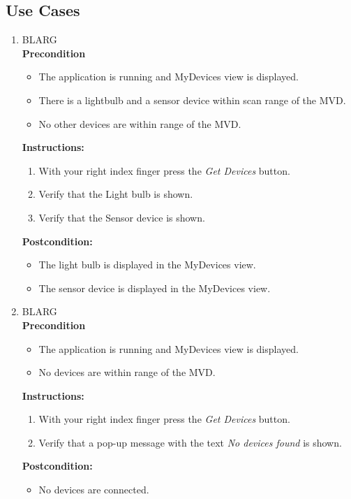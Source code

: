 \documentclass[a4paper]{article}
\newlength{\testlabellength}
\newenvironment{testlist}{\begin{enumerate}[label=\bfseries Instruction \thesubsection.\arabic* , labelindent=0pt, labelwidth=\testlabellength , leftmargin=2cm]}{\end{enumerate}}
\newenvironment{precondition}{
{\color{white}BLARG}\\ 
\textbf{Precondition}
\begin{itemize}[labelindent=0cm, labelwidth=2cm , leftmargin=1cm]
}
{\end{itemize}}
\newenvironment{instruction}{
\textbf{Instructions:}
\begin{enumerate}[label=\bfseries  \arabic*., labelindent=0cm, labelwidth=2cm , leftmargin=1cm]
}
{\end{enumerate}}
\newenvironment{postcondition}{
\textbf{Postcondition:}
\begin{itemize}[labelindent=0cm, labelwidth=2cm , leftmargin=1cm]
}
{\end{itemize}}
\begin{document}
\begin{appendices}
\subsection{Use Cases}
\begin{testlist}
	\item 
		\begin{precondition}
			\item The application is running and MyDevices view is displayed.
			\item There is a lightbulb and a sensor device within scan range of the MVD.
			\item No other devices are within range of the MVD.
		\end{precondition}
		\begin{instruction}
			\item With your right index finger press the \emph{Get Devices} button.
			\item Verify that the Light bulb is shown.
			\item Verify that the Sensor device is shown.
		\end{instruction}
		\begin{postcondition}
			\item The light bulb is displayed in the MyDevices view.
		 	\item The sensor device is displayed in the MyDevices view.
		\end{postcondition}

	\item 
	\begin{precondition}
		\item The application is running and MyDevices view is displayed.
		\item No devices are within range of the MVD.
	\end{precondition}
	\begin{instruction}
			\item With your right index finger press the \emph{Get Devices} button.
			\item Verify that a pop-up message with the text \emph{No devices found} is shown.
	\end{instruction}
	\begin{postcondition}
		\item No devices are connected.
	\end{postcondition}
	

\end{testlist}
\end{appendices}
\end{document}
